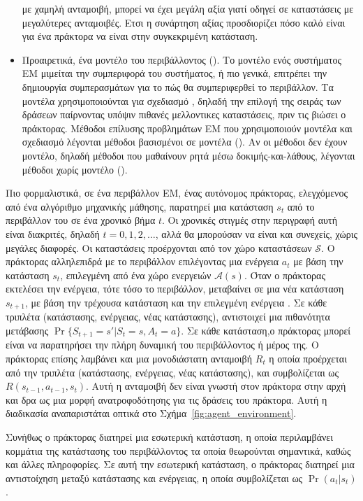 \begin{itemize}
          με χαμηλή ανταμοιβή, μπορεί να έχει μεγάλη αξία γιατί οδηγεί σε καταστάσεις με μεγαλύτερες ανταμοιβές. Ετσι η συνάρτηση αξίας προσδιορίζει πόσο καλό είναι για ένα πράκτορα να είναι στην συγκεκριμένη κατάσταση.
    \item Προαιρετικά, ένα μοντέλο του περιβάλλοντος (). Το μοντέλο ενός συστήματος ΕΜ μιμείται την
          συμπεριφορά του συστήματος, ή πιο γενικά, επιτρέπει την δημιουργία συμπερασμάτων για το πώς θα
          συμπεριφερθεί το περιβάλλον. Τα μοντέλα χρησιμοποιούνται για σχεδιασμό , δηλαδή την επίλογή της
          σειράς των δράσεων παίρνοντας υπόψιν πιθανές μελλοντικες καταστάσεις, πριν τις βιώσει ο πράκτορας.
          Μέθοδοι επίλυσης προβλημάτων ΕΜ που χρησιμοποιούν μοντέλα και σχεδιασμό λέγονται μέθοδοι βασισμένοι
          σε μοντέλα (). Αν οι μέθοδοι δεν έχουν μοντέλο, δηλαδή μέθοδοι που μαθαίνουν ρητά μέσω
          δοκιμής-και-λάθους, λέγονται μέθοδοι χωρίς μοντέλο ().
\end{itemize}

Πιο φορμαλιστικά, σε ένα περιβάλλον ΕΜ, ένας αυτόνομος πράκτορας, ελεγχόμενος από ένα αλγόριθμο μηχανικής μάθησης,
παρατηρεί μια κατάσταση $s_t$ από το περιβάλλον του σε ένα χρονικό βήμα $t$. Οι χρονικές στιγμές στην περιγραφή αυτή είναι διακριτές,
δηλαδή $t=0,1,2,\ldots$, αλλά θα μπορούσαν να είναι και συνεχείς, χώρις μεγάλες διαφορές. Οι καταστάσεις προέρχονται από τον
χώρο καταστάσεων $\mathcal{S}$. Ο πράκτορας αλληλεπιδρά με το περιβάλλον επιλέγοντας μια ενέργεια $a_t$ με βάση την κατάσταση
$s_t$, επιλεγμένη από ένα χώρο ενεργειών $\mathcal{A}(s)$. Όταν ο πράκτορας εκτελέσει την ενέργεια, τότε τόσο το περιβάλλον,
μεταβαίνει σε μια νέα κατάσταση $s_{t+1}$, με βάση την τρέχουσα κατάσταση και την επιλεγμένη
ενέργεια \cite{drlbs}. Σε κάθε τριπλέτα (κατάστασης, ενέργειας, νέας κατάστασης), αντιστοιχεί μια πιθανότητα μετάβασης
$\Pr{\{S_{t+1}=s'|S_t=s, A_{t}=a\}}$. Σε κάθε κατάσταση,ο πράκτορας μπορεί είναι να παρατηρήσει την πλήρη δυναμική του
περιβάλλοντος ή μέρος της. Ο πράκτορας επίσης λαμβάνει και μια μονοδιάστατη ανταμοιβή $R_t$
η οποία προέρχεται από την τριπλέτα (κατάστασης, ενέργειας, νέας κατάστασης), και συμβολίζεται ως
$R(s_{t-1}, a_{t-1}, s_t)$. Αυτή η ανταμοιβή δεν είναι γνωστή στον πράκτορα στην αρχή και
δρα ως μια μορφή ανατροφοδότησης για τις δράσεις του πράκτορα.
Αυτή η διαδικασία αναπαριστάται οπτικά στο Σχήμα~\ref{fig:agent_environment}.


Συνήθως ο πράκτορας διατηρεί μια εσωτερική κατάσταση, η οποία περιλαμβάνει κομμάτια της κατάστασης του περιβάλλοντος τα οποία θεωρούνται
σημαντικά, καθώς και άλλες πληροφορίες. Σε αυτή την εσωτερική κατάσταση, ο πράκτορας
διατηρεί μια αντιστοίχηση μεταξύ κατάστασης και ενέργειας, η οποία συμβολίζεται ως $\Pr(a_t | s_t)$.

